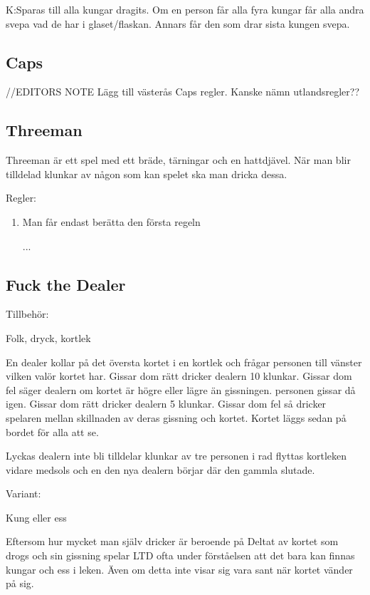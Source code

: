 K:Sparas till alla kungar dragits. Om en person får alla fyra kungar får alla andra svepa vad de har i glaset/flaskan.
Annars får den som drar sista kungen svepa.
\subsection*{\textbf{Caps}}

//EDITORS NOTE Lägg till västerås Caps regler. Kanske nämn utlandsregler??

\subsection*{\textbf{Threeman}}

Threeman är ett spel med ett bräde, tärningar och en hattdjävel. När man blir
tilldelad klunkar av någon som kan spelet ska man dricka dessa.

Regler:

\begin{enumerate}
    \item Man får endast berätta den första regeln
    \item[...]
\end{enumerate}

\subsection*{\textbf{Fuck the Dealer}}

Tillbehör:

Folk, dryck, kortlek

En dealer kollar på det översta kortet i en kortlek och frågar personen till vänster vilken valör kortet har. Gissar dom rätt dricker dealern 10 klunkar. Gissar dom fel säger dealern om kortet är högre eller lägre än gissningen. personen gissar då igen. Gissar dom rätt dricker dealern 5 klunkar. Gissar dom fel så dricker spelaren mellan skillnaden av deras gissning och kortet. Kortet läggs sedan på bordet för alla att se. 

Lyckas dealern inte bli tilldelar klunkar av tre personen i rad flyttas kortleken vidare medsols och en den nya dealern börjar där den gammla slutade.

Variant:

Kung eller ess

Eftersom hur mycket man själv dricker är beroende på Deltat av kortet som drogs och sin gissning spelar LTD ofta under förståelsen att det bara kan finnas kungar och ess i leken. Även om detta inte visar sig vara sant när kortet vänder på sig.

